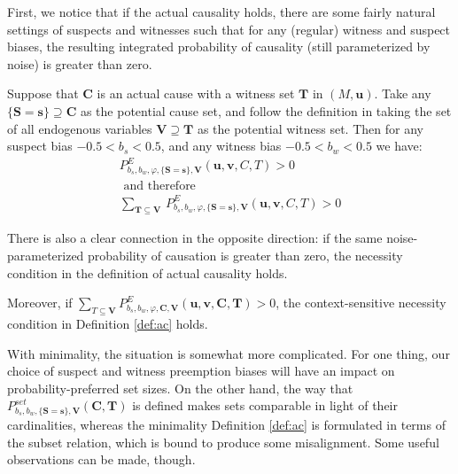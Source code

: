 \documentclass[anon,12pt]{clear2025} %
\begin{document}
First, we notice that if the actual causality holds, there are some fairly natural settings of suspects and witnesses such that for any (regular) witness and suspect biases, the resulting integrated probability of causality (still parameterized by noise) is greater than zero.


\begin{theorem}\label{th:ac-exp}
    Suppose that $\mathbf{C}$ is an actual cause with a witness set $\mathbf{T}$ in $(M, \mathbf{u})$.  Take any  $\{\mathbf{S} = \mathbf{s}\} \supseteq \mathbf{C}$ as the potential cause set, and follow the definition in taking the set of all endogenous variables $\mathbf{V} \supseteq \mathbf{T}$ as the potential witness set. Then for any suspect bias  $ - 0.5 < b_s < 0.5$, and  any witness  bias $ - 0.5 < b_w < 0.5$ we have: \begin{align}
    P^{E}_{b_s, b_w , \varphi, \{\mathbf{S} = \mathbf{s}\}, \mathbf{V}}(\mathbf{u}, \mathbf{v}, C, T) > 0 \label{eq:pect}\\
    \text{ and therefore } \nonumber\\ 
\sum_{\mathbf{T} \subseteq \mathbf{V}}\, P^E_{b_s, b_w , \varphi, \{\mathbf{S} = \mathbf{s}\}, \mathbf{V}}(\mathbf{u}, \mathbf{v}, C, T) > 0 \end{align}
\end{theorem}


There is also a clear connection in the opposite direction: if the same noise-parameterized probability of causation is greater than zero, the necessity condition in the definition of actual causality holds.


\begin{theorem}\label{th:exp-ac} Moreover, if  
$\sum_{T \subseteq \mathbf{V}} P^{E}_{b_s, b_w, \varphi, \mathbf{C}, \mathbf{V}}(\mathbf{u}, \mathbf{v}, \mathbf{C}, \mathbf{T}) > 0$,  the context-sensitive necessity condition in Definition \ref{def:ac} holds. \label{th:if_pr_then_nec}
\end{theorem}






With minimality, the situation is somewhat more complicated. For one thing, our choice of suspect and witness preemption biases will have an impact on probability-preferred set sizes. On the other hand, the way that  $P^{\mathit{set}}_{b_s,b_w, \{\mathbf{S}=\mathbf{s}\}, \mathbf{V}}(\mathbf{C}, \mathbf{T})$ is defined makes sets comparable in light of their cardinalities, whereas the minimality Definition \ref{def:ac}  is formulated in terms of the subset relation, which is bound to produce some misalignment. Some useful observations can be made, though.
\end{document}
